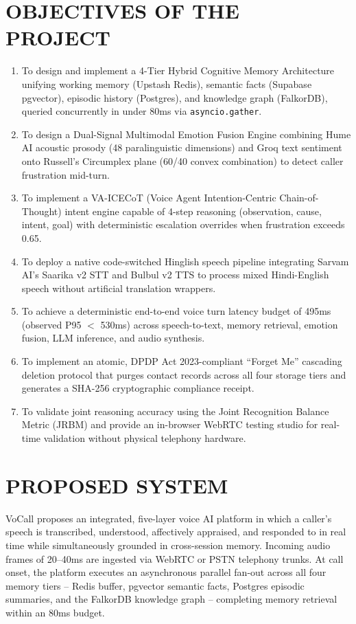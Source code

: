 \documentclass[12pt,a4paper]{article}
\begin{document}
\section{OBJECTIVES OF THE PROJECT}
\begin{enumerate}
    \item To design and implement a 4-Tier Hybrid Cognitive Memory Architecture unifying working memory (Upstash Redis), semantic facts (Supabase pgvector), episodic history (Postgres), and knowledge graph (FalkorDB), queried concurrently in under 80ms via \texttt{asyncio.gather}.
    \item To design a Dual-Signal Multimodal Emotion Fusion Engine combining Hume AI acoustic prosody (48 paralinguistic dimensions) and Groq text sentiment onto Russell's Circumplex plane (60/40 convex combination) to detect caller frustration mid-turn.
    \item To implement a VA-ICECoT (Voice Agent Intention-Centric Chain-of-Thought) intent engine capable of 4-step reasoning (observation, cause, intent, goal) with deterministic escalation overrides when frustration exceeds 0.65.
    \item To deploy a native code-switched Hinglish speech pipeline integrating Sarvam AI's Saarika v2 STT and Bulbul v2 TTS to process mixed Hindi-English speech without artificial translation wrappers.
    \item To achieve a deterministic end-to-end voice turn latency budget of 495ms (observed P95 $<$ 530ms) across speech-to-text, memory retrieval, emotion fusion, LLM inference, and audio synthesis.
    \item To implement an atomic, DPDP Act 2023-compliant ``Forget Me'' cascading deletion protocol that purges contact records across all four storage tiers and generates a SHA-256 cryptographic compliance receipt.
    \item To validate joint reasoning accuracy using the Joint Recognition Balance Metric (JRBM) and provide an in-browser WebRTC testing studio for real-time validation without physical telephony hardware.
\end{enumerate}

\section{PROPOSED SYSTEM}
VoCall proposes an integrated, five-layer voice AI platform in which a caller's speech is transcribed, understood, affectively appraised, and responded to in real time while simultaneously grounded in cross-session memory. Incoming audio frames of 20--40ms are ingested via WebRTC or PSTN telephony trunks. At call onset, the platform executes an asynchronous parallel fan-out across all four memory tiers -- Redis buffer, pgvector semantic facts, Postgres episodic summaries, and the FalkorDB knowledge graph -- completing memory retrieval within an 80ms budget.
\end{document}
